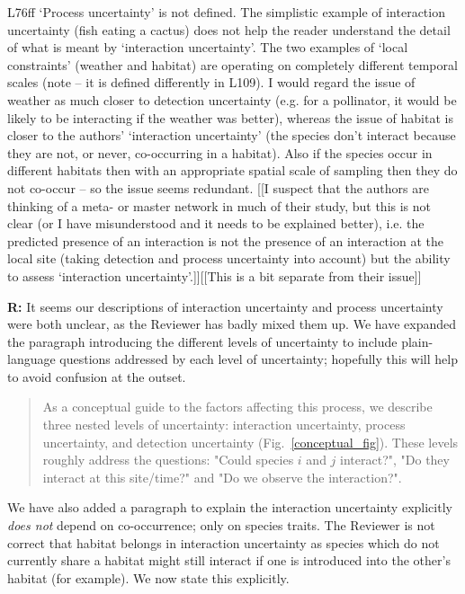 \documentclass[12pt]{letter}
\begin{document}
L76ff ‘Process uncertainty’ is not defined. The simplistic example of interaction uncertainty (fish eating a cactus) does not help the reader understand the detail of what is meant by ‘interaction uncertainty’. The two examples of ‘local constraints’ (weather and habitat) are operating on completely different temporal scales (note – it is defined differently in L109). I would regard the issue of weather as much closer to detection uncertainty (e.g. for a pollinator, it would be likely to be interacting if the weather was better), whereas the issue of habitat is closer to the authors’ ‘interaction uncertainty’ (the species don’t interact because they are not, or never, co-occurring in a habitat). Also if the species occur in different habitats then with an appropriate spatial scale of sampling then they do not co-occur – so the issue seems redundant. [[I suspect that the authors are thinking of a meta- or master network in much of their study, but this is not clear (or I have misunderstood and it needs to be explained better), i.e. the predicted presence of an interaction is not the presence of an interaction at the local site (taking detection and process uncertainty into account) but the ability to assess ‘interaction uncertainty’.]][[This is a bit separate from their issue]]


\textbf{R:} It seems our descriptions of interaction uncertainty and process uncertainty were both unclear, as the Reviewer has badly mixed them up. We have expanded the paragraph introducing the different levels of uncertainty to include plain-language questions addressed by each level of uncertainty; hopefully this will help to avoid confusion at the outset.
	
	\begin{quotation}

		As a conceptual guide to the factors affecting this process, we describe three nested levels of uncertainty: interaction uncertainty, process uncertainty, and detection uncertainty (Fig.~\ref{conceptual_fig}). These levels roughly address the questions: "Could species $i$ and $j$ interact?", "Do they interact at this site/time?" and "Do we observe the interaction?".

	\end{quotation}

We have also added a paragraph to explain the interaction uncertainty explicitly \emph{does not} depend on co-occurrence; only on species traits. The Reviewer is not correct that habitat belongs in interaction uncertainty as species which do not currently share a habitat might still interact if one is introduced into the other's habitat (for example). We now state this explicitly.
\end{document}
